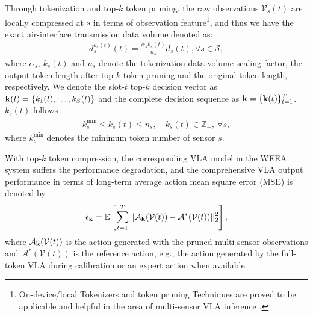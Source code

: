 \documentclass[lettersize,journal]{IEEEtran}
\theoremstyle{custom}
\begin{document}
Through tokenization and top-$k$ token pruning, the raw observations $\mathcal{V}_s(t)$ are locally compressed at $s$ in terms of observation feature\footnote{On-device/local Tokenizers and token pruning Techniques are proved to be applicable and helpful in the area of multi-sensor VLA inference \cite{liu2026vlapruner,wang2026specprune}. }, and thus we have the exact air-interface transmission data volume denoted as: 
\begin{align}
    d_s^{k_s(t)}(t) = \frac{\alpha_s k_s(t)}{n_s} d_s(t), \forall s \in \mathcal{S}, 
\end{align}
where $\alpha_s$, $k_s(t)$ and $n_s$ denote the tokenization data-volume scaling factor, the output token length after top-$k$ token pruning and the original token length, respectively. We denote the slot-$t$ top-$k$ decision vector as ${\bf k}(t)=\{k_1(t),\ldots,k_S(t)\}$ and the complete decision sequence as ${\bf k}=\{{\bf k}(t)\}_{t=1}^{T}$. $k_s(t)$ follows
\begin{align}\label{token_cons}
    k_s^{\min}\leq k_s(t)\leq n_s,\quad k_s(t)\in\mathbb Z_+, \ \forall s,
\end{align}
where $k_s^{\min}$ denotes the minimum token number of sensor $s$. 

With top-$k$ token compression, the corresponding VLA model in the WEEA system suffers the performance degradation, and the comprehensive VLA output performance in terms of long-term average action mean square error (MSE) is denoted by 
\begin{align}
    \epsilon_{\bf k} = \mathbb{E} \left[\sum_{t = 1}^T\vert\vert \mathcal{A}_{\bf k}(\mathcal{V}(t)) - \mathcal{A}^*(\mathcal{V}(t)) \vert\vert^2_2\right], 
\end{align}
where $\mathcal{A}_{\bf k}(\mathcal{V}(t))$ is the action generated with the pruned multi-sensor observations and $\mathcal{A}^*(\mathcal{V}(t))$ is the reference action, e.g., the action generated by the full-token VLA during calibration or an expert action when available. 

\end{document}
